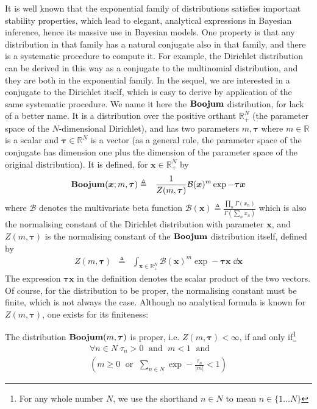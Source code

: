 It is well known that the exponential family of distributions satisfies important stability properties, which lead to elegant, analytical expressions in Bayesian inference, hence its massive use in Bayesian models. One property is that any distribution in that family has a natural conjugate also in that family, and there is a systematic procedure to compute it. For example, the Dirichlet distribution can be derived in this way as a conjugate to the multinomial distribution, and they are both in the exponential family. In the sequel, we are interested in a conjugate to the Dirichlet itself, which is easy to derive by application of the same systematic procedure. We name it here the $\mathbf{Boojum}$ distribution, for lack of a better name. It is a distribution over the positive orthant $\mathbb{R}_+^N$ (the parameter space of the $N$-dimensional Dirichlet), and has two parameters $m,\boldsymbol{\tau}$ where $m\in\mathbb{R}$ is a scalar and $\boldsymbol{\tau}\in\mathbb{R}^N$ is a vector (as a general rule, the parameter space of the conjugate has dimension one plus the dimension of the parameter space of the original distribution). It is defined, for $\boldsymbol{x}\in\mathbb{R}_+^N$ by
\begin{eqnarray*}
\mathbf{Boojum}(\boldsymbol{x};m,\boldsymbol{\tau}) & \triangleq & \frac{1}{Z(m,\boldsymbol{\tau})}\mathcal{B}(\boldsymbol{x})^m\exp-\boldsymbol{\tau}\boldsymbol{x}
\end{eqnarray*}
where $\mathcal{B}$ denotes the multivariate beta function $\mathcal{B}(\boldsymbol{x})\triangleq\frac{\prod_n\Gamma(x_n)}{\Gamma(\sum_nx_n)}$ which is also the normalising constant of the Dirichlet distribution with parameter $\boldsymbol{x}$, and $Z(m,\boldsymbol{\tau})$ is the normalising constant of the $\mathbf{Boojum}$ distribution itself, defined by
\begin{eqnarray*}
Z(m,\boldsymbol{\tau}) & \triangleq & \int_{\boldsymbol{x}\in\mathbb{R}_+^N}\mathcal{B}(\boldsymbol{x})^m\exp-\boldsymbol{\tau} \boldsymbol{x}\;\dd{\boldsymbol{x}}
\end{eqnarray*}
The expression $\boldsymbol{\tau} \boldsymbol{x}$ in the definition denotes the scalar product of the two vectors. Of course, for the distribution to be proper, the normalising constant must be finite, which is not always the case. Although no analytical formula is known for $Z(m,\boldsymbol{\tau})$, one exists for its finiteness:
\begin{proposition}
\label{prop:mbeta-proper}
The distribution $\mathbf{Boojum}(m,\boldsymbol{\tau})$ is proper, i.e. $Z(m,\boldsymbol{\tau})<\infty$, if and only if\footnote{For any whole number $N$, we use the shorthand $n\in N$ to mean $n\in\{1\ldots N\}$}
\[
\begin{array}{l}
\forall n\in N\;\tau_n>0 \;\textrm{ and }\; m<1 \;\textrm{ and }\\
(m\geq0 \;\textrm{ or }\; \sum_{n\in N}\exp-\frac{\tau_n}{|m|}<1)
\end{array}
\]
\end{proposition}
